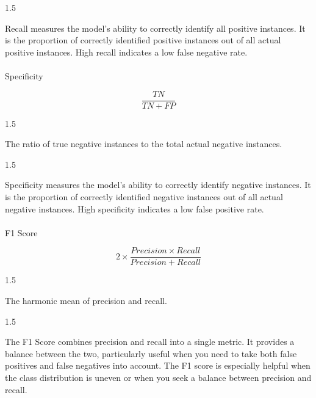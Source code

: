 \documentclass[
  a4paper,
]{scrbook}
\makeatletter
\let\oldparagraph\paragraph
\renewcommand{\paragraph}{
    \@ifstar
      \xxxParagraphStar
      \xxxParagraphNoStar
  }
\newcommand{\xxxParagraphStar}[1]{\oldparagraph*{#1}\mbox{}}
\newcommand{\xxxParagraphNoStar}[1]{\oldparagraph{#1}\mbox{}}
\let\olddescription\description
\let\endolddescription\enddescription
\renewenvironment{description}{
          \begin{spacing}{1.5}\olddescription
        }{
          \endolddescription\end{spacing}
        }
\makeatother
\begin{document}
\begin{description}
\item[Interpretation]
Recall measures the model's ability to correctly identify all positive
instances. It is the proportion of correctly identified positive
instances out of all actual positive instances. High recall indicates a
low false negative rate.
\end{description}

\paragraph{Specificity}\label{specificity}

\[\frac{TN}{TN+FP}\]

\begin{description}
\item[Definition]
The ratio of true negative instances to the total actual negative
instances.
\end{description}

\begin{description}
\item[Interpretation]
Specificity measures the model's ability to correctly identify negative
instances. It is the proportion of correctly identified negative
instances out of all actual negative instances. High specificity
indicates a low false positive rate.
\end{description}

\paragraph{F1 Score}\label{f1-score}

\[2\times\frac{Precision\times Recall}{Precision + Recall}\]

\begin{description}
\item[Definition]
The harmonic mean of precision and recall.
\end{description}

\begin{description}
\item[Interpretation]
The F1 Score combines precision and recall into a single metric. It
provides a balance between the two, particularly useful when you need to
take both false positives and false negatives into account. The F1 score
is especially helpful when the class distribution is uneven or when you
seek a balance between precision and recall.
\end{description}
\end{document}
